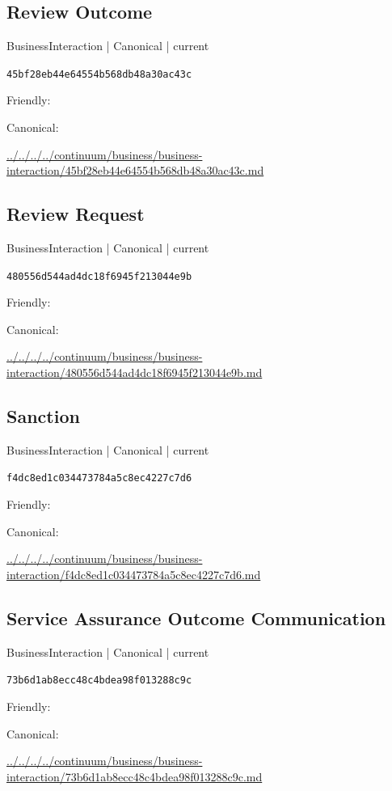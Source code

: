 \documentclass[10pt,a4paper]{article}
\begin{document}
\subsection*{Review Outcome}
{\small BusinessInteraction | Canonical | current}\par
\texttt{45bf28eb44e64554b568db48a30ac43c}\par
Friendly: \par
Canonical: \par
{\footnotesize\url{../../../../continuum/business/business-interaction/45bf28eb44e64554b568db48a30ac43c.md}}\par
\subsection*{Review Request}
{\small BusinessInteraction | Canonical | current}\par
\texttt{480556d544ad4dc18f6945f213044e9b}\par
Friendly: \par
Canonical: \par
{\footnotesize\url{../../../../continuum/business/business-interaction/480556d544ad4dc18f6945f213044e9b.md}}\par
\subsection*{Sanction}
{\small BusinessInteraction | Canonical | current}\par
\texttt{f4dc8ed1c034473784a5c8ec4227c7d6}\par
Friendly: \par
Canonical: \par
{\footnotesize\url{../../../../continuum/business/business-interaction/f4dc8ed1c034473784a5c8ec4227c7d6.md}}\par
\subsection*{Service Assurance Outcome Communication}
{\small BusinessInteraction | Canonical | current}\par
\texttt{73b6d1ab8ecc48c4bdea98f013288c9c}\par
Friendly: \par
Canonical: \par
{\footnotesize\url{../../../../continuum/business/business-interaction/73b6d1ab8ecc48c4bdea98f013288c9c.md}}\par
\end{document}
